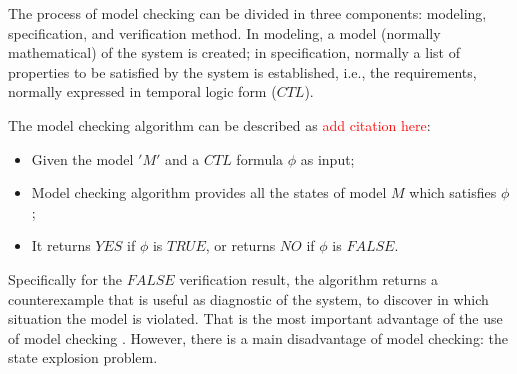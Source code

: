 \documentclass[journal]{IEEEtran}
\begin{document}
The process of model checking can be divided in three components: modeling, specification, and verification method. In modeling, a model (normally mathematical) of the system is created; in specification, normally a list of properties to be satisfied by the system is established, i.e., the requirements, normally  expressed in temporal logic form ($CTL$).


The model checking algorithm can be described as \textcolor{red}{add citation here}:  

\begin{itemize}
\item Given the model $ 'M' $ and a $CTL$ formula $ \phi $ as input;  
\item Model checking algorithm provides all the states of model $ M $ which satisfies $ \phi $;  
\item It returns $YES$ if $ \phi $ is $TRUE$, or returns $NO$ if $ \phi $ is $FALSE$.  

\end{itemize}
Specifically for the $FALSE$ verification result, the algorithm returns a counterexample that is useful as diagnostic of the system, to discover in which situation the model is violated. That is the most important advantage of the use of model checking \cite{Clarke2008}. 
However, there is a main disadvantage of model checking: the state explosion problem. 
%
%
\end{document}
